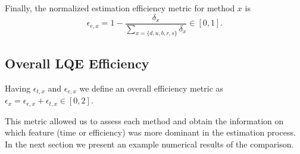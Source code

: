 \documentclass[11pt,draftclsnofoot,journal,onecolumn]{IEEEtran}
\begin{document}
Finally, the normalized estimation efficiency metric for method $x$ is
\begin{equation}
\epsilon_{e,x}=1-\frac{\delta_{x}}{\sum_{x=\{d, u, b, r, s\}}\delta_x}\in[0,1].
\end{equation}

\subsection{Overall LQE Efficiency}

Having $\epsilon_{t,x}$ and $\epsilon_{e,x}$ we define an overall efficiency metric as $\epsilon_{x}=\epsilon_{e,x}+\epsilon_{t,x}\in[0,2]$.

This metric allowed us to assess each method and obtain the information on which feature (time or efficiency) was more dominant in the estimation process. In the next section we present an example numerical results of the comparison.
\end{document}
